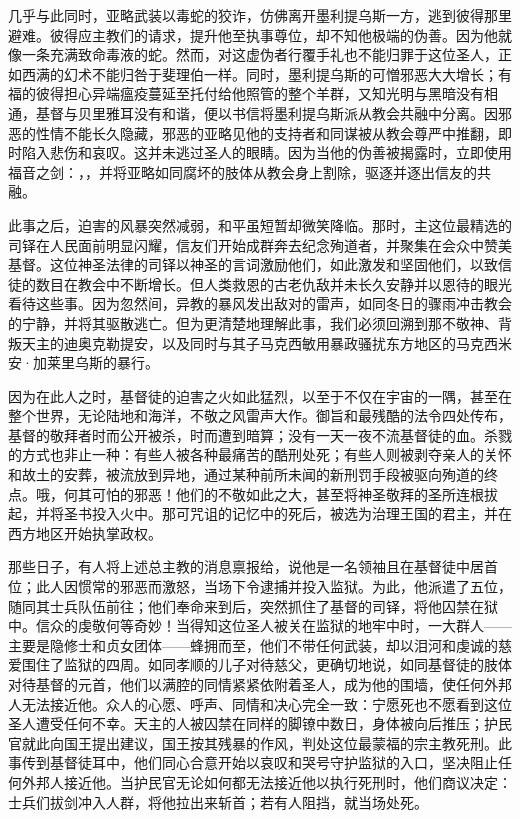 几乎与此同时，亚略武装以毒蛇的狡诈，仿佛离开墨利提乌斯一方，逃到彼得那里避难。彼得应主教们的请求，提升他至执事尊位，却不知他极端的伪善。因为他就像一条充满致命毒液的蛇。然而，对这虚伪者行覆手礼也不能归罪于这位圣人，正如西满的幻术不能归咎于斐理伯一样。同时，墨利提乌斯的可憎邪恶大大增长；有福的彼得担心异端瘟疫蔓延至托付给他照管的整个羊群，又知光明与黑暗没有相通，基督与贝里雅耳没有和谐，便以书信将墨利提乌斯派从教会共融中分离。因邪恶的性情不能长久隐藏，邪恶的亚略见他的支持者和同谋被从教会尊严中推翻，即时陷入悲伤和哀叹。这并未逃过圣人的眼睛。因为当他的伪善被揭露时，立即使用福音之剑：，，并将亚略如同腐坏的肢体从教会身上割除，驱逐并逐出信友的共融。\par

此事之后，迫害的风暴突然减弱，和平虽短暂却微笑降临。那时，主这位最精选的司铎在人民面前明显闪耀，信友们开始成群奔去纪念殉道者，并聚集在会众中赞美基督。这位神圣法律的司铎以神圣的言词激励他们，如此激发和坚固他们，以致信徒的数目在教会中不断增长。但人类救恩的古老仇敌并未长久安静并以恩待的眼光看待这些事。因为忽然间，异教的暴风发出敌对的雷声，如同冬日的骤雨冲击教会的宁静，并将其驱散逃亡。但为更清楚地理解此事，我们必须回溯到那不敬神、背叛天主的迪奥克勒提安，以及同时与其子马克西敏用暴政骚扰东方地区的马克西米安·加莱里乌斯的暴行。\par

因为在此人之时，基督徒的迫害之火如此猛烈，以至于不仅在宇宙的一隅，甚至在整个世界，无论陆地和海洋，不敬之风雷声大作。御旨和最残酷的法令四处传布，基督的敬拜者时而公开被杀，时而遭到暗算；没有一天一夜不流基督徒的血。杀戮的方式也非止一种：有些人被各种最痛苦的酷刑处死；有些人则被剥夺亲人的关怀和故土的安葬，被流放到异地，通过某种前所未闻的新刑罚手段被驱向殉道的终点。哦，何其可怕的邪恶！他们的不敬如此之大，甚至将神圣敬拜的圣所连根拔起，并将圣书投入火中。那可咒诅的记忆中的死后，被选为治理王国的君主，并在西方地区开始执掌政权。\par

那些日子，有人将上述总主教的消息禀报给，说他是一名领袖且在基督徒中居首位；此人因惯常的邪恶而激怒，当场下令逮捕并投入监狱。为此，他派遣了五位，随同其士兵队伍前往；他们奉命来到后，突然抓住了基督的司铎，将他囚禁在狱中。信众的虔敬何等奇妙！当得知这位圣人被关在监狱的地牢中时，一大群人——主要是隐修士和贞女团体——蜂拥而至，他们不带任何武装，却以泪河和虔诚的慈爱围住了监狱的四周。如同孝顺的儿子对待慈父，更确切地说，如同基督徒的肢体对待基督的元首，他们以满腔的同情紧紧依附着圣人，成为他的围墙，使任何外邦人无法接近他。众人的心愿、呼声、同情和决心完全一致：宁愿死也不愿看到这位圣人遭受任何不幸。天主的人被囚禁在同样的脚镣中数日，身体被向后推压；护民官就此向国王提出建议，国王按其残暴的作风，判处这位最蒙福的宗主教死刑。此事传到基督徒耳中，他们同心合意开始以哀叹和哭号守护监狱的入口，坚决阻止任何外邦人接近他。当护民官无论如何都无法接近他以执行死刑时，他们商议决定：士兵们拔剑冲入人群，将他拉出来斩首；若有人阻挡，就当场处死。\par

